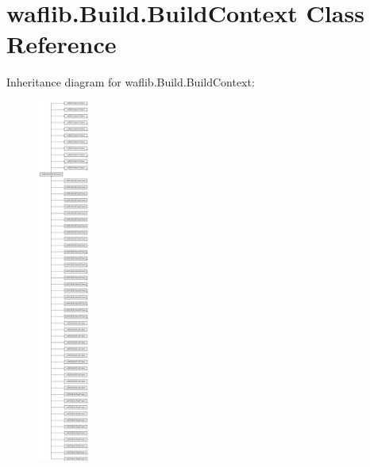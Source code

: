 \hypertarget{classwaflib_1_1_build_1_1_build_context}{}\section{waflib.\+Build.\+Build\+Context Class Reference}
\label{classwaflib_1_1_build_1_1_build_context}
Inheritance diagram for waflib.\+Build.\+Build\+Context\+:\begin{figure}[H]
\begin{center}
\leavevmode
\includegraphics[height=12.000000cm]{classwaflib_1_1_build_1_1_build_context}
\end{center}
\end{figure}
